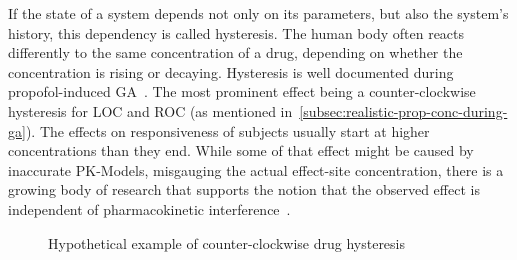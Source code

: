 If the state of a system depends not only on its parameters, but also the system's history,
this dependency is called hysteresis.
The human body often reacts differently to the same concentration of a drug,
depending on whether the concentration is rising or decaying.
Hysteresis is well documented during propofol-induced GA~\cite{kuizenga_quantitative_1998,
    iwakiri_individual_2005,
    sepulveda_evidence_2018,ferreira_patterns_2020, su_hysteresis_2020}.
The most prominent effect being a counter-clockwise hysteresis for LOC and ROC (as mentioned
in~\ref{subsec:realistic-prop-conc-during-ga}).
The effects on responsiveness of subjects usually start at higher concentrations than they end.
While some of that effect might be caused by inaccurate PK-Models,
misgauging the actual effect-site concentration,
there is a growing body of research that supports the notion that the observed effect is independent of
pharmacokinetic interference~\cite{hutt_progress_2011, su_hysteresis_2020}.
\begin{figure}[H]
    \centering
    \pgfplotsset{compat = newest}

    \caption{Hypothetical example of counter-clockwise drug hysteresis}
    \label{fig:hystersis_in_general}
\end{figure}
